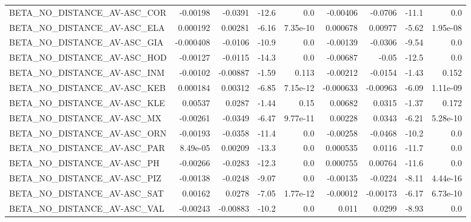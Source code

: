 \begin{tabular}{lrrrrrrrr}
BETA\_NO\_DISTANCE\_AV-ASC\_COR             &    -0.00198 &      -0.0391 &   -12.6 &      0.0 &   -0.00406 &     -0.0706 &        -11.1 &           0.0 \\
BETA\_NO\_DISTANCE\_AV-ASC\_ELA             &    0.000192 &      0.00281 &   -6.16 & 7.35e-10 &   0.000678 &     0.00977 &        -5.62 &      1.95e-08 \\
BETA\_NO\_DISTANCE\_AV-ASC\_GIA             &   -0.000408 &      -0.0106 &   -10.9 &      0.0 &   -0.00139 &     -0.0306 &        -9.54 &           0.0 \\
BETA\_NO\_DISTANCE\_AV-ASC\_HOD             &    -0.00127 &      -0.0115 &   -14.3 &      0.0 &   -0.00687 &       -0.05 &        -12.5 &           0.0 \\
BETA\_NO\_DISTANCE\_AV-ASC\_INM             &    -0.00102 &     -0.00887 &   -1.59 &    0.113 &   -0.00212 &     -0.0154 &        -1.43 &         0.152 \\
BETA\_NO\_DISTANCE\_AV-ASC\_KEB             &    0.000184 &      0.00312 &   -6.85 & 7.15e-12 &  -0.000633 &    -0.00963 &        -6.09 &      1.11e-09 \\
BETA\_NO\_DISTANCE\_AV-ASC\_KLE             &     0.00537 &       0.0287 &   -1.44 &     0.15 &    0.00682 &      0.0315 &        -1.37 &         0.172 \\
BETA\_NO\_DISTANCE\_AV-ASC\_MX              &    -0.00261 &      -0.0349 &   -6.47 & 9.77e-11 &    0.00228 &      0.0343 &        -6.21 &      5.28e-10 \\
BETA\_NO\_DISTANCE\_AV-ASC\_ORN             &    -0.00193 &      -0.0358 &   -11.4 &      0.0 &   -0.00258 &     -0.0468 &        -10.2 &           0.0 \\
BETA\_NO\_DISTANCE\_AV-ASC\_PAR             &    8.49e-05 &      0.00209 &   -13.3 &      0.0 &   0.000535 &      0.0116 &        -11.7 &           0.0 \\
BETA\_NO\_DISTANCE\_AV-ASC\_PH              &    -0.00266 &      -0.0283 &   -12.3 &      0.0 &   0.000755 &     0.00764 &        -11.6 &           0.0 \\
BETA\_NO\_DISTANCE\_AV-ASC\_PIZ             &    -0.00138 &      -0.0248 &   -9.07 &      0.0 &   -0.00135 &     -0.0224 &        -8.11 &      4.44e-16 \\
BETA\_NO\_DISTANCE\_AV-ASC\_SAT             &     0.00162 &       0.0278 &   -7.05 & 1.77e-12 &   -0.00012 &    -0.00173 &        -6.17 &      6.73e-10 \\
BETA\_NO\_DISTANCE\_AV-ASC\_VAL             &    -0.00243 &     -0.00883 &   -10.2 &      0.0 &      0.011 &      0.0299 &        -8.93 &           0.0 \\

\end{tabular}
